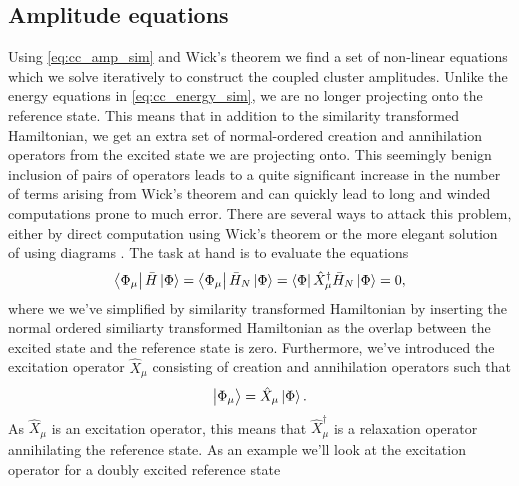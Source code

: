         \subsection{Amplitude equations}
            Using \autoref{eq:cc_amp_sim} and Wick's theorem we find a set of
            non-linear equations which we solve iteratively to construct the
            coupled cluster amplitudes.
            Unlike the energy equations in \autoref{eq:cc_energy_sim}, we are no
            longer projecting onto the reference state.
            This means that in addition to the similarity transformed
            Hamiltonian, we get an extra set of normal-ordered creation and
            annihilation operators from the excited state we are projecting
            onto.
            This seemingly benign inclusion of pairs of operators leads to a
            quite significant increase in the number of terms arising from
            Wick's theorem and can quickly lead to long and winded computations
            prone to much error.
            There are several ways to attack this problem, either by direct
            computation using Wick's theorem \cite{crawford2000introduction} or
            the more elegant solution of using diagrams \cite{shavitt2009many,
            crawford2000introduction}.
            The task at hand is to evaluate the equations
            \begin{align}
                \bra{\Phi_{\mu}}\bar{H}\ket{\Phi}
                = \bra{\Phi_{\mu}}\bar{H}_N\ket{\Phi}
                = \bra{\Phi}\hat{X}^{\dagger}_{\mu}\bar{H}_N\ket{\Phi}
                = 0,
            \end{align}
            where we we've simplified by similarity transformed Hamiltonian
            by inserting the normal ordered similiarty transformed Hamiltonian
            as the overlap between the excited state and the reference state is
            zero.
            Furthermore, we've introduced the excitation operator
            $\hat{X}_{\mu}$ consisting of creation and annihilation operators
            such that
            \begin{align}
                \ket{\Phi_{\mu}} = \hat{X}_{\mu}\ket{\Phi}.
            \end{align}
            As $\hat{X}_{\mu}$ is an excitation operator, this means that
            $\hat{X}^{\dagger}_{\mu}$ is a relaxation operator annihilating the
            reference state.
            As an example we'll look at the excitation operator for a doubly
            excited reference state
